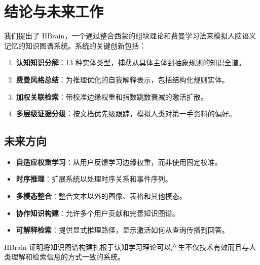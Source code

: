 \documentclass[11pt]{article}
\begin{document}
\section{结论与未来工作}
\label{sec:conclusion}

我们提出了 HBrain，一个通过整合西蒙的组块理论和费曼学习法来模拟人脑语义记忆的知识图谱系统。系统的关键创新包括：

\begin{enumerate}
    \item \textbf{认知知识分解}：13 种实体类型，捕获从具体主体到抽象规则的知识全谱。
    \item \textbf{费曼风格总结}：为推理优化的自我解释表示，包括结构化规则实体。
    \item \textbf{加权关联检索}：带校准边缘权重和指数跳数衰减的激活扩散。
    \item \textbf{多层级证据分级}：按文档优先级跟踪，模拟人类对第一手资料的偏好。
\end{enumerate}

\subsection{未来方向}

\begin{itemize}
    \item \textbf{自适应权重学习}：从用户反馈学习边缘权重，而非使用固定校准。
    \item \textbf{时序推理}：扩展系统以处理时序关系和事件序列。
    \item \textbf{多模态整合}：整合文本以外的图像、表格和其他模态。
    \item \textbf{协作知识构建}：允许多个用户贡献和完善知识图谱。
    \item \textbf{可解释检索}：提供显式推理路径，显示激活如何从查询传播到回答。
\end{itemize}

HBrain 证明将知识图谱构建扎根于认知学习理论可以产生不仅技术有效而且与人类理解和检索信息的方式一致的系统。
\end{document}

